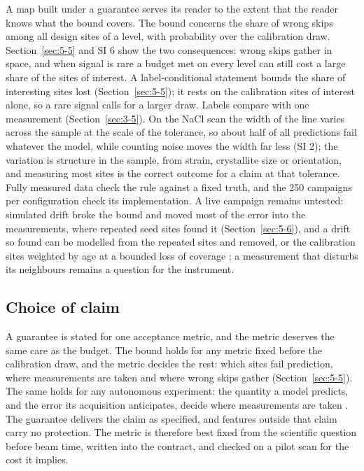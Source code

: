\documentclass{iopjournal}
\begin{document}
A map built under a guarantee serves its reader to the extent that the reader knows what the bound covers. The bound concerns the share of wrong skips among all design sites of a level, with probability over the calibration draw. Section~\ref{sec:5-5} and SI 6 show the two consequences: wrong skips gather in space, and when signal is rare a budget met on every level can still cost a large share of the sites of interest. A label-conditional statement bounds the share of interesting sites lost (Section~\ref{sec:5-5}); it rests on the calibration sites of interest alone, so a rare signal calls for a larger draw. Labels compare with one measurement (Section~\ref{sec:3-5}). On the NaCl scan the width of the line varies across the sample at the scale of the tolerance, so about half of all predictions fail whatever the model, while counting noise moves the width far less (SI 2); the variation is structure in the sample, from strain, crystallite size or orientation, and measuring most sites is the correct outcome for a claim at that tolerance. Fully measured data check the rule against a fixed truth, and the 250 campaigns per configuration check its implementation. A live campaign remains untested: simulated drift broke the bound and moved most of the error into the measurements, where repeated seed sites found it (Section~\ref{sec:5-6}), and a drift so found can be modelled from the repeated sites and removed, or the calibration sites weighted by age at a bounded loss of coverage \cite{Barber2023}; a measurement that disturbs its neighbours remains a question for the instrument.

\hypertarget{choice-of-claim}{%
\subsection{Choice of claim}\label{choice-of-claim}}

A guarantee is stated for one acceptance metric, and the metric deserves the same care as the budget. The bound holds for any metric fixed before the calibration draw, and the metric decides the rest: which sites fail prediction, where measurements are taken and where wrong skips gather (Section~\ref{sec:5-5}). The same holds for any autonomous experiment: the quantity a model predicts, and the error its acquisition anticipates, decide where measurements are taken \cite{Noack2019,Noack2020}. The guarantee delivers the claim as specified, and features outside that claim carry no protection. The metric is therefore best fixed from the scientific question before beam time, written into the contract, and checked on a pilot scan for the cost it implies.
\end{document}
